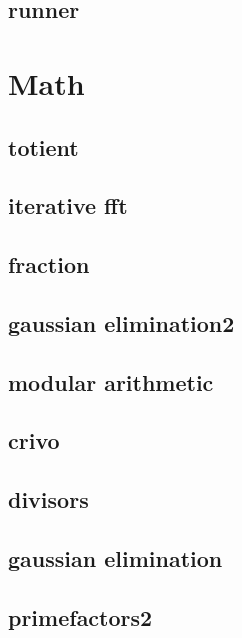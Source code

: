 \subsection{runner}
\raggedbottom
\hrulefill

\section{Math}
\subsection{totient}
\raggedbottom
\hrulefill
\subsection{iterative fft}
\raggedbottom
\hrulefill
\subsection{fraction}
\raggedbottom
\hrulefill
\subsection{gaussian elimination2}
\raggedbottom
\hrulefill
\subsection{modular arithmetic}
\raggedbottom
\hrulefill
\subsection{crivo}
\raggedbottom
\hrulefill
\subsection{divisors}
\raggedbottom
\hrulefill
\subsection{gaussian elimination}
\raggedbottom
\hrulefill
\subsection{primefactors2}
\raggedbottom
\hrulefill
